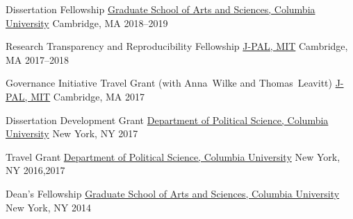 



\begin{cvhonors}

\cvhonor
    {Dissertation Fellowship} %
    {\href{http://gsas.columbia.edu/content/fellowship-categories}{Graduate School of Arts and Sciences, Columbia University}} %
    {Cambridge, MA} %
    {2018--2019} %

\cvhonor
    {Research Transparency and Reproducibility Fellowship} %
    {\href{https://www.povertyactionlab.org/rt}{J-PAL, MIT}} %
    {Cambridge, MA} %
    {2017--2018} %

  \cvhonor
    {Governance Initiative Travel Grant (with Anna~Wilke and Thomas~Leavitt)} %
    {\href{https://www.povertyactionlab.org/GI}{J-PAL, MIT}} %
    {Cambridge, MA} %
    {2017} %

  \cvhonor
    {Dissertation Development Grant} %
    {\href{http://polisci.columbia.edu/}{Department of Political Science, Columbia University}} %
    {New York, NY} %
    {2017} %

  \cvhonor
    {Travel Grant} %
    {\href{http://polisci.columbia.edu/}{Department of Political Science, Columbia University}} %
    {New York, NY} %
    {2016,2017} %

  \cvhonor
    {Dean's Fellowship} %
    {\href{http://gsas.columbia.edu/content/fellowship-categories}{Graduate School of Arts and Sciences, Columbia University}} %
    {New York, NY} %
    {2014} %


\end{cvhonors}
